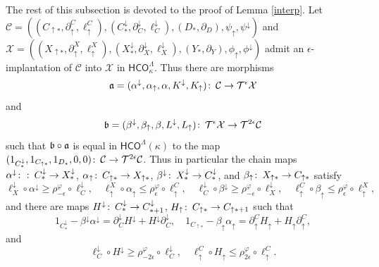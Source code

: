 \documentclass[11pt]{amsart}
\theoremstyle{definition}
\theoremstyle{remark}
\numberwithin{equation}{section}
\def\co{\colon\thinspace}
\def\ep{\epsilon}
\begin{document}
The rest of this subsection is devoted to the proof of Lemma \ref{interp}. Let \\ $\mathcal{C}=\left((C_{\uparrow *},\partial_{\uparrow}^C,\ell_{\uparrow}^C),(C^{\downarrow}_{*},\partial^{\downarrow}_C,\ell^{\downarrow}_C),(D_*,\partial_D),\psi_{\uparrow},\psi^{\downarrow}\right)$ and $\mathcal{X}=\left((X_{\uparrow *},\partial_{\uparrow}^X,\ell_{\uparrow}^X),(X^{\downarrow}_{*},\partial^{\downarrow}_X,\ell^{\downarrow}_X),(Y_*,\partial_Y),\phi_{\uparrow},\phi^{\downarrow}\right)$ admit an $\ep$-implantation of $\mathcal{C}$ into $\mathcal{X}$ in $\mathsf{HCO}^{\Lambda}_{\kappa}$.  Thus there are morphisms \[ \frak{a}=(\alpha^{\downarrow},\alpha_{\uparrow},\alpha,K^{\downarrow},K_{\uparrow})\co \mathcal{C}\to \mathcal{T}^{\ep}\mathcal{X} \] and  \[ \frak{b}=(\beta^{\downarrow},\beta_{\uparrow},\beta,L^{\downarrow},L_{\uparrow})\co\mathcal{T}^{\ep}\mathcal{X}\to\mathcal{T}^{2\ep}\mathcal{C} \] such that $\frak{b}\circ\frak{a}$ is equal in $\mathsf{HCO}^{\Lambda}(\kappa)$ to the map $(1_{C^{\downarrow}_{*}},1_{C_{\uparrow *}},1_{D_*},0,0)\co \mathcal{C}\to\mathcal{T}^{2\ep}\mathcal{C}$. Thus in particular the chain maps $\alpha^{\downarrow}\co \co C^{\downarrow}_{*}\to X^{\downarrow}_{*}$, $\alpha_{\uparrow}\co C_{\uparrow *}\to X_{\uparrow *}$, $\beta^{\downarrow}\co X^{\downarrow}_{*}\to C^{\downarrow}_{*}$, and $\beta_{\uparrow}\co X_{\uparrow *}\to C_{\uparrow *}$ satisfy \[ \ell_{X}^{\downarrow}\circ\alpha^{\downarrow}\geq \rho_{-\ep}^{\varphi}\circ \ell_{C}^{\downarrow},\quad \ell^{X}_{\uparrow}\circ\alpha_{\uparrow}\leq \rho_{\ep}^{\varphi}\circ \ell^{C}_{\uparrow},\quad \ell_{C}^{\downarrow}\circ\beta^{\downarrow}\geq \rho_{-\ep}^{\varphi}\circ \ell_{X}^{\downarrow},\quad \ell^{C}_{\uparrow}\circ\beta_{\uparrow}\leq \rho_{\ep}^{\varphi}\circ \ell^{X}_{\uparrow},\]
and
there are maps $H^{\downarrow}\co C^{\downarrow}_{ *}\to C^{\downarrow}_{*+1}$, $H_{\uparrow}\co C_{\uparrow *}\to C_{\uparrow *+1}$
such that\[ 1_{C^{\downarrow}_{*}}-\beta^{\downarrow}\alpha^{\downarrow}=\partial^{\downarrow}_{C}H^{\downarrow}+H^{\downarrow}\partial^{\downarrow}_{C},\quad 1_{C_{\uparrow*}}-\beta_{\uparrow}\alpha_{\uparrow}=\partial_{\uparrow}^{C}H_{\uparrow}+H_{\uparrow}\partial_{\uparrow}^{C},  \] and \[ \ell^{\downarrow}_{C}\circ H^{\downarrow}\geq \rho_{-2\ep}^{\varphi}\circ \ell^{\downarrow}_{C},\quad \ell_{\uparrow}^{C}\circ H_{\uparrow}\leq \rho_{2\ep}^{\varphi}\circ\ell^{C}_{\uparrow}.\]
\end{document}
